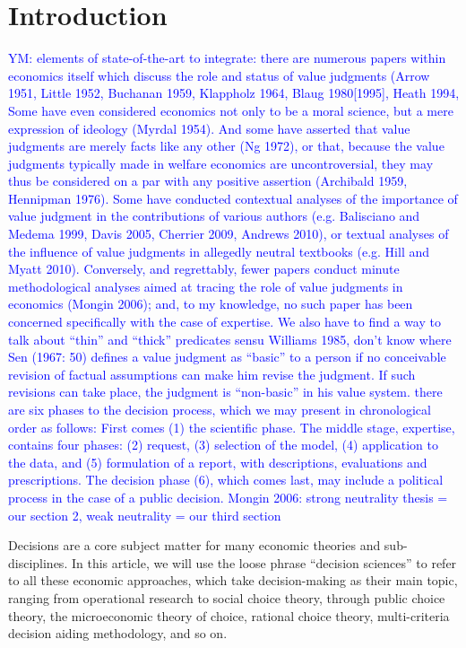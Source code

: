 \documentclass[preprint, french, english, 11pt]{elsarticle}%
\newcommand{\commentYM}[1]{\textcolor{blue}{YM: #1}}
\begin{document}
\section{Introduction}

\commentYM{elements of state-of-the-art to integrate: there are numerous papers within economics itself
which discuss the role and status of value judgments (Arrow 1951, Little 1952,
Buchanan 1959, Klappholz 1964, Blaug 1980[1995], Heath 1994, Some have
even considered economics not only to be a moral science, but a mere expression
of ideology (Myrdal 1954). And some have asserted that value judgments
are merely facts like any other (Ng 1972), or that, because the value judgments
typically made in welfare economics are uncontroversial, they may thus be considered
on a par with any positive assertion (Archibald 1959, Hennipman 1976).
Some have conducted contextual analyses of the importance of value judgment
in the contributions of various authors (e.g. Balisciano and Medema 1999, Davis
2005, Cherrier 2009, Andrews 2010), or textual analyses of the influence of value
judgments in allegedly neutral textbooks (e.g. Hill and Myatt 2010). Conversely,
and regrettably, fewer papers conduct minute methodological analyses aimed at
tracing the role of value judgments in economics (Mongin 2006); and, to my
knowledge, no such paper has been concerned specifically with the case of expertise.
We also have to find a way to talk about ``thin'' and ``thick'' predicates sensu Williams 1985, don't know where
Sen (1967: 50) defines a value judgment
as “basic” to a person if no conceivable revision of factual assumptions can
make him revise the judgment. If such revisions can take place, the judgment is
“non-basic” in his value system.
there are six phases to the decision
process, which we may present in chronological order as follows: First comes
(1) the scientific phase. The middle stage, expertise, contains four phases: (2) request,
(3) selection of the model, (4) application to the data, and (5) formulation of
a report, with descriptions, evaluations and prescriptions. The decision phase (6),
which comes last, may include a political process in the case of a public decision.
Mongin 2006: strong neutrality thesis = our section 2, weak neutrality = our third section}

Decisions are a core subject matter for many economic theories and sub-disciplines. In this article, we will use the loose phrase ``decision sciences'' to refer to all these economic approaches, which take decision-making as their main topic, ranging from operational research to social choice theory, through public choice theory, the microeconomic theory of choice, rational choice theory, multi-criteria decision aiding methodology, and so on.
\end{document}
